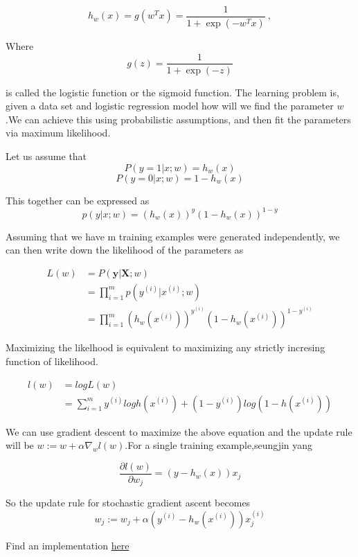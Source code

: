 \documentclass[12pt]{article}
\begin{document}
$$h_{w}(x) = g(w^{T}x) = \frac{1}{1 + \exp{(-w^{T}x)}} \ ,$$

Where $$g(z)= \frac{1}{1+ \exp{(-z)}}$$

is called the logistic function or the sigmoid function.
The learning problem is, given a data set and logistic regression model how will we find the parameter $w$.We can achieve this using probabilistic assumptions, and then fit the parameters via maximum likelihood.

Let us assume that 
$$P(y =1 \vert x;w) = h_{w}(x)$$
$$P(y =0 \vert  x;w) = 1 - h_{w}(x)$$

This together can be expressed as
 $$p(y \vert x;w) = (h_{w}(x))^{y}(1-h_{w}(x))^{1-y}$$
 
 Assuming that we have m training  examples were generated independently, we
 can then write down the likelihood of the parameters as
 
\begin{equation}
 \begin{split}
L(w) & = P(\textbf{y} \vert \textbf{X} ; w) \\
& = \prod_{i=1}^{m} p(y^{(i)} \vert x ^{(i)};w) \\
& = \prod_{i=1}^{m}  (h_{w}(x^{(i)}))^{y^{(i)}}(1-h_{w}(x^{(i)}))^{1-y^{(i)}} 
 \end{split}
\end{equation}


Maximizing the likelhood is equivalent to maximizing any strictly incresing function of likelihood.

\begin{equation}
\begin{split}
l(w) & = log L(w) \\ 
& = \sum_{i =1}^{m} y^{(i)} log h(x^{(i)}) + (1-y^{(i)}) log(1-h(x^{(i)}))
\end{split}
\end{equation}

We can use gradient descent to maximize the above equation and the update rule will be $w := w +\alpha \nabla _{w}l(w)$.For a single training example,seungjin yang 




$$\frac{\partial l(w)}{\partial w_{j}} = (y - h_w(x))x_{j}   $$

So the update rule for stochastic gradient ascent becomes $$w_{j} := w_{j} +\alpha (y^{(i)} - h_w(x^{(i)}))x^{(i)}_{j}$$


Find an implementation \href{https://github.com/aswin16/ML-REPORT/blob/master/codes/log_regression.ipynb}{here}
\end{document}
